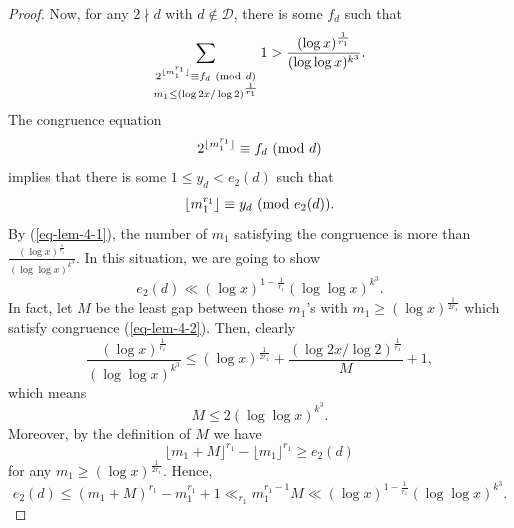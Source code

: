 \documentclass[12pt,a4paper,reqno]{amsart}
\numberwithin{equation}{section}
\def\pmod #1{\ ({\rm{mod}}\ #1)}
\theoremstyle{plain}
\theoremstyle{definition}
\begin{document}
\begin{proof}
Now, for any $2\nmid d$ with $d\not\in \mathcal{D}$, there is some $f_d$ such that
\begin{align}\label{eq-lem-4-1}
\sum_{\substack{2^{ \lfloor m_1^{r_1}\rfloor}\equiv f_d\pmod{d}\\ m_1\le (\log 2x/\log 2)^{\frac{1}{r_1}}}}1 > \frac{(\log x)^{\frac{1}{r_1}}}{(\log\log x)^{k^3}}.
\end{align}
The congruence equation
$$
2^{ \lfloor m_1^{r_1}\rfloor}\equiv f_d\pmod{d}
$$
implies that there is some $1\le y_d< e_2(d)$ such that
\begin{align}\label{eq-lem-4-2}
\lfloor m_1^{r_1}\rfloor\equiv y_d\pmod{e_2(d)}.
\end{align}
By (\ref{eq-lem-4-1}), the number of $m_1$ satisfying the congruence is more than $\frac{(\log x)^{\frac{1}{r_1}}}{(\log\log x)^{k^3}}$. In this situation, we are going to show 
$$
e_2(d)\ll (\log x)^{1-\frac{1}{r_1}}(\log\log x)^{k^3}.
$$
In fact, let $M$ be the least gap between those $m_1$'s with $m_1\ge (\log x)^{\frac{1}{2r_1}}$ which satisfy congruence (\ref{eq-lem-4-2}). Then, clearly
$$
\frac{(\log x)^{\frac{1}{r_1}}}{(\log\log x)^{k^3}}\le (\log x)^{\frac{1}{2r_1}}+\frac{(\log 2x/\log 2)^{\frac{1}{r_1}}}{M}+1,
$$
which means
$$
M\le 2(\log\log x)^{k^3}.
$$
Moreover, by the definition of $M$ we have
$$
\lfloor m_1+M\rfloor^{r_1}-\lfloor m_1\rfloor^{r_1}\ge e_2(d)
$$
for any $m_1\ge (\log x)^{\frac{1}{2r_1}}$. Hence, 
$$
e_2(d)\le (m_1+M)^{r_1}-m_1^{r_1}+1\ll_{r_1} m_1^{r_1-1}M\ll (\log x)^{1-\frac{1}{r_1}}(\log\log x)^{k^3}.
$$


\end{proof}
\end{document}
